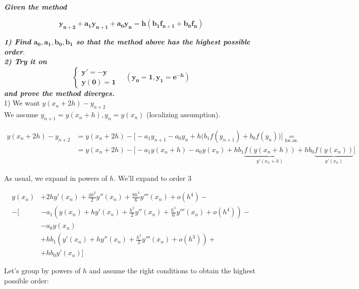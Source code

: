 \begin{example}
    \-\\
    \textit{\textbf{Given the method}}

    \[
      \boldsymbol{y_{n+2} + a_1y_{n+1} + a_0y_n = h(b_1f_{n+1} + b_0f_n)}
    \]
    
    \textit{\textbf{1) Find $\boldsymbol{a_0,a_1,b_0,b_1}$ so that the method above has the highest possible order}}.\\
    
   \textit{\textbf{2) Try it on $$\boldsymbol{\begin{cases}y' = -y \\ y(0) = 1\end{cases}}\quad (\boldsymbol{y_0=1, y_1=e^{-h}})$$
    and prove the method diverges.}}\\
    
    1) We want $y(x_n + 2h) - y_{n+2}$ \\
    
    We assume $y_{n+1} = y(x_n + h), y_n = y(x_n)$ (localizing assumption).
    
    
    \begin{align*}
        y(x_n + 2h) - y_{n+2} &= y(x_n + 2h) - \Big[-a_1y_{n+1} - a_0y_n + h\big(b_1f(y_{n+1}) + b_0f(y_n)\big) \Big]\underset{\text{loc.as.}}{=}\\
        &= y(x_n + 2h) - \Big[-a_1y(x_n+h) - a_0y(x_n) + hb_1\underbrace{f\left(y(x_n+h)\right)}_{y'(x_n + h)} + hb_0\underbrace{f\left(y(x_n)\right)}_{y'(x_n)} \Big]
    \end{align*}
    
    \newpage
    As usual, we expand in powers of $h$. We'll expand to order 3
    
    \begin{align*}
        y(x_n) &+ 2hy'(x_n) + \frac{4h^2}{2}y''(x_n) + \frac{8h^3}{6}y'''(x_n) + o(h^4) - \\
        -\bigg[ &-a_1\left(y(x_n) + hy'(x_n) + \frac{h^2}{2}y''(x_n) + \frac{h^3}{6}y'''(x_n) + o(h^4)\right) - \\
        &-a_0y(x_n) \\
        &+hb_1\left(y'(x_n) + hy''(x_n) + \frac{h^2}{2}y'''(x_n) + o(h^3) \right) + \\
        &+hb_0y'(x_n)\bigg]
    \end{align*}
    
    Let's group by powers of $h$ and assume the right conditions to obtain the highest possible order:\\
    

\end{example}
